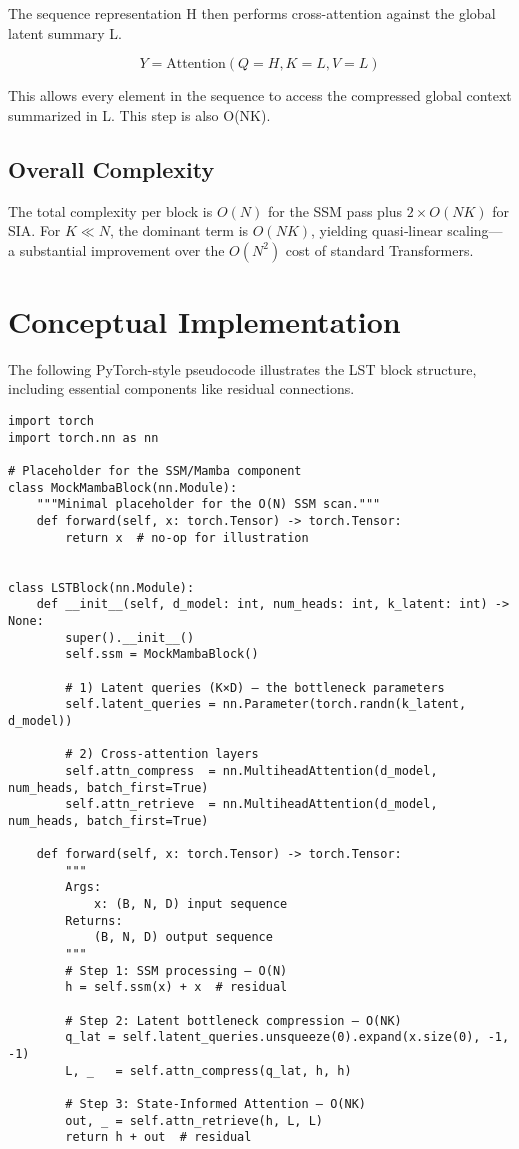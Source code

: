 \documentclass[10pt,twocolumn,letterpaper]{article}
\begin{document}
The sequence representation H then performs cross-attention against the global latent summary L.

\begin{equation}
Y = \text{Attention}(Q=H, K=L, V=L)
\end{equation}

This allows every element in the sequence to access the compressed global context summarized in L. This step is also O(NK).

\subsection{Overall Complexity}

The total complexity per block is \(O(N)\) for the SSM pass plus \(2\times O(NK)\) for SIA. For \(K\ll N\), the dominant term is \(O(NK)\), yielding quasi‑linear scaling— a substantial improvement over the \(O(N^{2})\) cost of standard Transformers.

\section{Conceptual Implementation}

The following PyTorch-style pseudocode illustrates the LST block structure, including essential components like residual connections.

\begin{lstlisting}[style=pytorchstyle, caption={PyTorch-style pseudocode for the LST Block.}, label=lst:code_block]
import torch
import torch.nn as nn

# Placeholder for the SSM/Mamba component
class MockMambaBlock(nn.Module):
    """Minimal placeholder for the O(N) SSM scan."""
    def forward(self, x: torch.Tensor) -> torch.Tensor:
        return x  # no‑op for illustration


class LSTBlock(nn.Module):
    def __init__(self, d_model: int, num_heads: int, k_latent: int) -> None:
        super().__init__()
        self.ssm = MockMambaBlock()

        # 1) Latent queries (K×D) – the bottleneck parameters
        self.latent_queries = nn.Parameter(torch.randn(k_latent, d_model))

        # 2) Cross‑attention layers
        self.attn_compress  = nn.MultiheadAttention(d_model, num_heads, batch_first=True)
        self.attn_retrieve  = nn.MultiheadAttention(d_model, num_heads, batch_first=True)

    def forward(self, x: torch.Tensor) -> torch.Tensor:
        """
        Args:
            x: (B, N, D) input sequence
        Returns:
            (B, N, D) output sequence
        """
        # Step 1: SSM processing — O(N)
        h = self.ssm(x) + x  # residual

        # Step 2: Latent bottleneck compression — O(NK)
        q_lat = self.latent_queries.unsqueeze(0).expand(x.size(0), -1, -1)
        L, _   = self.attn_compress(q_lat, h, h)

        # Step 3: State‑Informed Attention — O(NK)
        out, _ = self.attn_retrieve(h, L, L)
        return h + out  # residual
\end{lstlisting}
\end{document}
